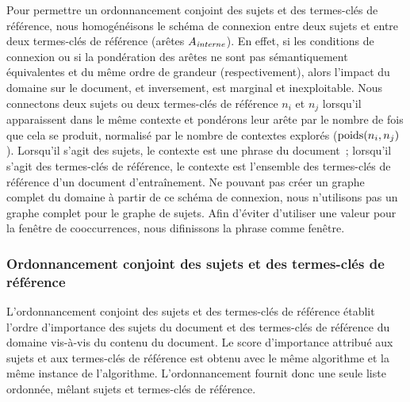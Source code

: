         Pour permettre un ordonnancement conjoint des sujets et des termes-clés
        de référence, nous homogénéisons le schéma de connexion entre deux
        sujets et entre deux termes-clés de référence (arêtes
        $A_\textnormal{\textit{interne}}$). En effet, si les conditions de
        connexion ou si la pondération des arêtes ne sont pas sémantiquement
        équivalentes et du même ordre de grandeur (respectivement), alors
        l'impact du domaine sur le document, et inversement, est marginal et
        inexploitable. Nous connectons deux sujets ou deux termes-clés de
        référence $n_i$ et $n_j$ lorsqu'il apparaissent dans le même contexte et
        pondérons leur arête par le nombre de fois que cela se produit,
        normalisé par le nombre de contextes explorés ($\textnormal{poids}(n_i,
        n_j)$). Lorsqu'il s'agit des sujets, le contexte est une phrase du
        document~; lorsqu'il
        s'agit des termes-clés de référence, le contexte est l'ensemble des
        termes-clés de référence d'un document d'entraînement. Ne pouvant pas
        créer un graphe complet du domaine à partir de ce schéma de connexion,
        nous n'utilisons pas un graphe complet pour le graphe de sujets. Afin
        d'éviter d'utiliser une valeur pour la fenêtre de cooccurrences, nous
        difinissons la phrase comme fenêtre.

      \subsubsection{Ordonnancement conjoint des sujets et des termes-clés de référence}
      \label{subsubsec:main-automatic_keyphrase_annotation-supervised_automatic_keyphrase_extraction-topiccorank-co_ranking}
        L'ordonnancement conjoint des sujets et des termes-clés de référence
        établit l'ordre d'importance des sujets du document et des termes-clés
        de référence du domaine vis-à-vis du contenu du document. Le score
        d'importance attribué aux sujets et aux termes-clés de référence est
        obtenu avec le même algorithme et la même instance de l'algorithme.
        L'ordonnancement fournit donc une seule liste ordonnée, mêlant sujets et
        termes-clés de référence.

